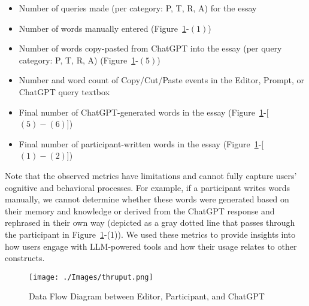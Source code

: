 \documentclass[manuscript,screen,acmsmall]{acmart}
\begin{document}
\begin{itemize}
    \item Number of queries made (per category: P, T, R, A) for the essay
    \item Number of words manually entered (Figure~\ref{fig:dataflow}-$(1)$)
    \item Number of words copy-pasted from ChatGPT into the essay (per query category: P, T, R, A) (Figure~\ref{fig:dataflow}-$(5)$)
    \item Number and word count of Copy/Cut/Paste events in the Editor, Prompt, or ChatGPT query textbox
    \item Final number of ChatGPT-generated words in the essay (Figure~\ref{fig:dataflow}-[$(5)-(6)$])
    \item Final number of participant-written words in the essay (Figure~\ref{fig:dataflow}-[$(1)-(2)$])
\end{itemize}

\noindent Note that the observed metrics have limitations and cannot fully capture users' cognitive and behavioral processes. For example, if a participant writes words manually, we cannot determine whether these words were generated based on their memory and knowledge or derived from the ChatGPT response and rephrased in their own way (depicted as a gray dotted line that passes through the participant in Figure~\ref{fig:dataflow}-(1)). We used these metrics to provide insights into how users engage with LLM-powered tools and how their usage relates to other constructs.



\begin{figure}[t]
    \centering
    \texttt{[image: ./Images/thruput.png]}
    \caption{Data Flow Diagram between Editor, Participant, and ChatGPT}
    \label{fig:dataflow}
\end{figure}

    
    
\end{document}
